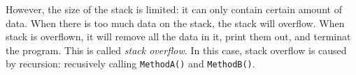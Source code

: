 \documentclass[../main.tex]{subfiles}
\begin{document}
    However, the size of the stack is limited: it can only contain certain amount
    of data. When there is too much data on the stack, the stack will overflow.
    When stack is overflown, it will remove all the data in it, print them out,
    and terminat the program. This is called \emph{stack overflow}. In this case,
    stack overflow is caused by recursion: recusively calling \texttt{MethodA()}
    and \texttt{MethodB()}.
\end{document}
